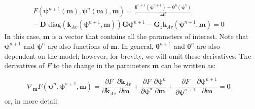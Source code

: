 \documentclass[preprint,review,3p,times,onecolumn,authoryear]{elsarticle}
\newcommand{\bfm}{\mathbf{m}}
\newcommand{\bftheta}{\boldsymbol{\theta}}
\newcommand{\bfpsi}{\boldsymbol{\psi}}
\newcommand{\nn}{^{n+1}}
\newcommand{\n}{^{n}}
\newcommand{\FF}{F}
\begin{document}
\begin{align}
\label{eq:richards-timestep}
F(\boldsymbol{\psi}^{n+1}(\mathbf{m}),\boldsymbol{\psi}^n(\mathbf{m}),\mathbf{m}) =
\frac{\boldsymbol{\theta}^{n+1}(\boldsymbol{\psi}^{n+1}) - \boldsymbol{\theta}^n(\boldsymbol{\psi}\n)}{\Delta t}
\nonumber\\-
\ \mathbf{D}
    \text{ diag}\left(\mathbf{k}_{Av}(\boldsymbol{\psi}^{n+1},\mathbf{m})\right)
    \mathbf{G} \boldsymbol{\psi}^{n+1}
-
\mathbf{G}_{z} \mathbf{k}_{Av}(\boldsymbol{\psi}^{n+1},\mathbf{m})
= 0
\end{align}
In this case, $\bfm$ is a vector that contains all the parameters of interest. Note that $\bfpsi\nn$ and $\bfpsi\n$ are also functions of $\bfm$. In general, $\bftheta\nn$ and $\bftheta\n$ are also dependent on the model; however, for brevity, we will omit these derivatives. The derivatives of $\FF$ to the change in the parameters $\bfm$ can be written as:

\begin{equation}
\label{eq:richards-timestep-chain}
    \nabla_\mathbf{m}  F(\boldsymbol{\psi}^n,\boldsymbol{\psi}^{n+1},\mathbf{m})
    =
    \frac{\partial F}{\partial \mathbf{k}_{Av}}
    \frac{\partial\mathbf{k}_{Av}}{\partial\mathbf{m}}
    + \frac{\partial F}{\partial \boldsymbol{\psi}^n}\frac{\partial\boldsymbol{\psi}^n}{\partial\mathbf{m}}
    + \frac{\partial F}{\partial \boldsymbol{\psi}^{n+1}}\frac{\partial\boldsymbol{\psi}^{n+1}}{\partial\mathbf{m}}
    =0
\end{equation}
or, in more detail:
\end{document}
